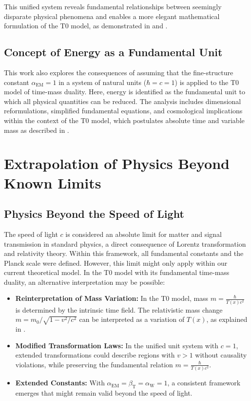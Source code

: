 \documentclass[12pt,a4paper]{article}
\newcommand{\Tfield}{T(x)}
\newcommand{\betaT}{\beta_{\text{T}}}
\newcommand{\alphaEM}{\alpha_{\text{EM}}}
\newcommand{\alphaW}{\alpha_{\text{W}}}
\begin{document}
	This unified system reveals fundamental relationships between seemingly disparate physical phenomena and enables a more elegant mathematical formulation of the T0 model, as demonstrated in \cite{pascher_lagrange_2025} and \cite{pascher_alphabeta_2025}.
	
	\subsection{Concept of Energy as a Fundamental Unit}
	\label{subsec:energy_concept}
	
	This work also explores the consequences of assuming that the fine-structure constant \(\alphaEM = 1\) in a system of natural units (\(\hbar = c = 1\)) is applied to the T0 model of time-mass duality. Here, energy is identified as the fundamental unit to which all physical quantities can be reduced. The analysis includes dimensional reformulations, simplified fundamental equations, and cosmological implications within the context of the T0 model, which postulates absolute time and variable mass as described in \cite{pascher_zeit_masse_2025}.
	
	\section{Extrapolation of Physics Beyond Known Limits}
	\label{sec:beyond_limits}
	
	\subsection{Physics Beyond the Speed of Light}
	\label{subsec:beyond_lightspeed}
	
	The speed of light \(c\) is considered an absolute limit for matter and signal transmission in standard physics, a direct consequence of Lorentz transformation and relativity theory. Within this framework, all fundamental constants and the Planck scale were defined. However, this limit might only apply within our current theoretical model. In the T0 model with its fundamental time-mass duality, an alternative interpretation may be possible:
	
	\begin{itemize}
		\item \textbf{Reinterpretation of Mass Variation:} In the T0 model, mass \(m = \frac{\hbar}{\Tfield c^2}\) is determined by the intrinsic time field. The relativistic mass change \(m = m_0/\sqrt{1-v^2/c^2}\) can be interpreted as a variation of \(\Tfield\), as explained in \cite{pascher_zeit_2025}.
		\item \textbf{Modified Transformation Laws:} In the unified unit system with \(c = 1\), extended transformations could describe regions with \(v > 1\) without causality violations, while preserving the fundamental relation \(m = \frac{\hbar}{\Tfield c^2}\).
		\item \textbf{Extended Constants:} With \(\alphaEM = \betaT = \alphaW = 1\), a consistent framework emerges that might remain valid beyond the speed of light.
	\end{itemize}
	
\end{document}
